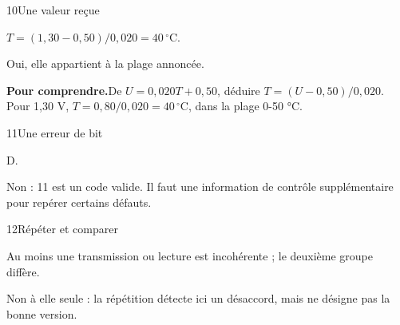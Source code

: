 \par\noindent\begin{minipage}{\linewidth}
\begin{corrige}{10}{Une valeur reçue}
\begin{questions}
\item $T=(1{,}30-0{,}50)/0{,}020=40\,^{\circ}\mathrm C$.
\item Oui, elle appartient à la plage annoncée.
\end{questions}
\par\smallskip\noindent\textbf{Pour comprendre.}\enspace De $U=0{,}020T+0{,}50$, déduire $T=(U-0{,}50)/0{,}020$. Pour 1,30 V, $T=0{,}80/0{,}020=40\,^{\circ}\mathrm C$, dans la plage 0-50 °C.\par
{}
\end{corrige}
\end{minipage}
\par\noindent\begin{minipage}{\linewidth}
\begin{corrige}{11}{Une erreur de bit}
\begin{questions}
\item D.
\item Non : 11 est un code valide. Il faut une information de contrôle supplémentaire pour repérer certains défauts.
\end{questions}
\end{corrige}
\end{minipage}
\par\noindent\begin{minipage}{\linewidth}
\begin{corrige}{12}{Répéter et comparer}
\begin{questions}
\item Au moins une transmission ou lecture est incohérente ; le deuxième groupe diffère.
\item Non à elle seule : la répétition détecte ici un désaccord, mais ne désigne pas la bonne version.
\end{questions}
\end{corrige}
\end{minipage}
